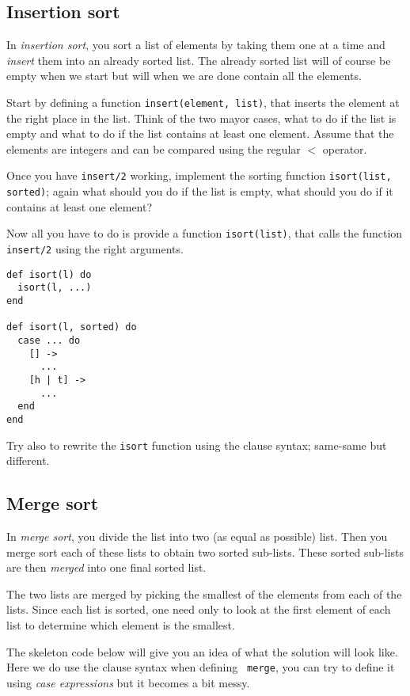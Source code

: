 \documentclass[a4paper,11pt]{article}
\begin{document}
\subsection{Insertion sort}

In {\em insertion sort}, you sort a list of elements by taking them
one at a time and {\em insert} them into an already sorted list. The
already sorted list will of course be empty when we start but will
when we are done contain all the elements.

Start by defining a function {\tt insert(element, list)}, that inserts
the element at the right place in the list. Think of the two mayor
cases, what to do if the list is empty and what to do if the list
contains at least one element. Assume that the elements are integers
and can be compared using the regular $<$ operator.

Once you have {\tt insert/2} working, implement the sorting function
{\tt isort(list, sorted)}; again what should you do if the list is
empty, what should you do if it contains at least one element?

Now all you have to do is provide a function {\tt isort(list)}, that
calls the function {\tt insert/2} using the right arguments.

\begin{verbatim}
def isort(l) do 
  isort(l, ...)
end

def isort(l, sorted) do
  case ... do
    [] -> 
      ...
    [h | t] ->
      ...
  end
end
\end{verbatim}

Try also to rewrite the {\tt isort} function using the clause syntax;
same-same but different.

\subsection{Merge sort}

In {\em merge sort}, you divide the list into two (as equal as
possible) list. Then you merge sort each of these lists to obtain two
sorted sub-lists. These sorted sub-lists are then {\em merged} into
one final sorted list. 

The two lists are merged by picking the smallest of the elements from
each of the lists. Since each list is sorted, one need only to look at
the first element of each list to determine which element is the
smallest.

The skeleton code below will give you an idea of what the solution
will look like. Here we do use the clause syntax when defining {\tt
  merge}, you can try to define it using {\em case expressions} but it
becomes a bit messy.
\end{document}
